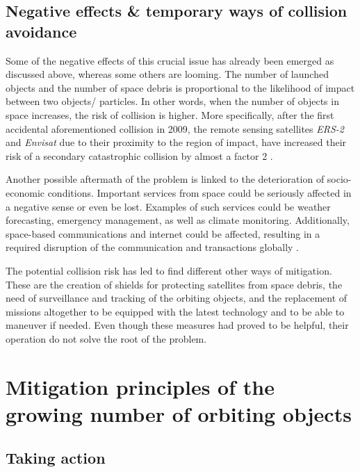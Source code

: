 \bigskip
\subsection{Negative effects \& temporary ways of collision avoidance}
\bigskip

Some of the negative effects of this crucial issue has already been emerged as discussed above, whereas some others are looming. The number of launched objects and the number of space debris is proportional to the likelihood of impact between two objects/ particles. In other words, when the number of objects in space increases, the risk of collision is higher. More specifically, after the first accidental aforementioned collision in 2009, the remote sensing satellites \textit{ERS-2} and \textit{Envisat} due to their proximity to the region of impact, have increased their risk of a secondary catastrophic collision by almost a factor 2 \cite{Klinkrad 2009}.

Another possible aftermath of the problem is linked to the deterioration of socio-economic conditions. Important services from space could be seriously affected in a negative sense or even be lost. Examples of such services could be weather forecasting, emergency management, as well as climate monitoring. Additionally, space-based communications and internet could be affected, resulting in a required disruption of the communication and transactions globally \cite{Undseth}.

\bigskip

The potential collision risk has led to find different other ways of mitigation. These are the creation of shields for protecting satellites from space debris, the need of surveillance and tracking of the orbiting objects, and the replacement of missions altogether to be equipped with the latest technology and to be able to maneuver if needed. Even though these measures had proved to be helpful, their operation do not solve the root of the problem.


\bigskip
\section{Mitigation principles of the growing number of orbiting objects}
\label{chap:mitigation}
\bigskip

\bigskip
\subsection{Taking action}
\bigskip

